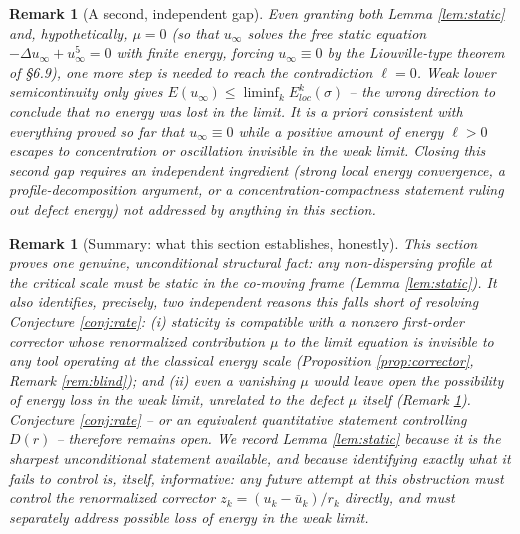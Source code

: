 \documentclass[11pt,letterpaper]{amsart}
\newtheorem{remark}[theorem]{Remark}
\begin{document}
\begin{remark}[A second, independent gap]
\label{rem:second-gap}
Even granting both Lemma \ref{lem:static} and, hypothetically, $\mu=0$
(so that $u_\infty$ solves the free static equation $-\Delta
u_\infty+u_\infty^5=0$ with finite energy, forcing $u_\infty\equiv0$ by
the Liouville-type theorem of \S6.9), one more step is needed to reach
the contradiction $\ell=0$. Weak lower semicontinuity only gives
$E(u_\infty)\le\liminf_k E^k_{loc}(\sigma)$ -- the wrong direction to
conclude that no energy was lost in the limit. It is a priori consistent
with everything proved so far that $u_\infty\equiv0$ while a positive
amount of energy $\ell>0$ escapes to concentration or oscillation
invisible in the weak limit. Closing this second gap requires an
independent ingredient (strong local energy convergence, a
profile-decomposition argument, or a concentration-compactness
statement ruling out defect energy) not addressed by anything in this
section.
\end{remark}

\begin{remark}[Summary: what this section establishes, honestly]
\label{rem:honest-summary}
This section proves one genuine, unconditional structural fact: any
non-dispersing profile at the critical scale must be static in the
co-moving frame (Lemma \ref{lem:static}). It also identifies, precisely,
\emph{two} independent reasons this falls short of resolving Conjecture
\ref{conj:rate}: (i) staticity is compatible with a nonzero first-order corrector
whose renormalized contribution $\mu$ to the limit equation is
invisible to any tool operating at the classical energy scale
(Proposition \ref{prop:corrector}, Remark \ref{rem:blind}); and (ii)
even a vanishing $\mu$ would leave open the possibility of energy loss
in the weak limit, unrelated to the defect $\mu$ itself (Remark
\ref{rem:second-gap}). Conjecture \ref{conj:rate} -- or an equivalent quantitative
statement controlling $D(r)$ -- therefore remains open. We record Lemma
\ref{lem:static} because it is the sharpest unconditional statement
available, and because identifying exactly what it fails to control is,
itself, informative: any future attempt at this obstruction must control
the renormalized corrector $z_k=(u_k-\bar u_k)/r_k$ directly, and must
separately address possible loss of energy in the weak limit.
\end{remark}
\end{document}
